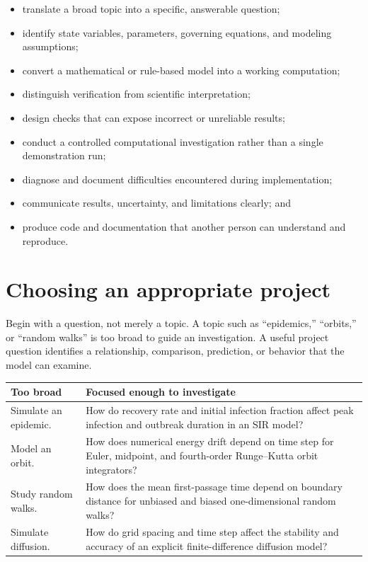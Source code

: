 \documentclass[11pt]{article}
\begin{document}
\begin{itemize}
  \item translate a broad topic into a specific, answerable question;
  \item identify state variables, parameters, governing equations, and modeling
        assumptions;
  \item convert a mathematical or rule-based model into a working computation;
  \item distinguish verification from scientific interpretation;
  \item design checks that can expose incorrect or unreliable results;
  \item conduct a controlled computational investigation rather than a single
        demonstration run;
  \item diagnose and document difficulties encountered during implementation;
  \item communicate results, uncertainty, and limitations clearly; and
  \item produce code and documentation that another person can understand and
        reproduce.
\end{itemize}

\section{Choosing an appropriate project}

Begin with a question, not merely a topic. A topic such as ``epidemics,''
``orbits,'' or ``random walks'' is too broad to guide an investigation. A useful
project question identifies a relationship, comparison, prediction, or behavior
that the model can examine.

\begin{center}
\begin{tabular}{>{\raggedright\arraybackslash}p{}
                >{\raggedright\arraybackslash}p{}}
\toprule
\rowcolor{lightgray}
\textbf{Too broad} & \textbf{Focused enough to investigate} \\
\midrule
Simulate an epidemic. & How do recovery rate and initial infection fraction
affect peak infection and outbreak duration in an SIR model? \\
Model an orbit. & How does numerical energy drift depend on time step for Euler,
midpoint, and fourth-order Runge--Kutta orbit integrators? \\
Study random walks. & How does the mean first-passage time depend on boundary
distance for unbiased and biased one-dimensional random walks? \\
Simulate diffusion. & How do grid spacing and time step affect the stability and
accuracy of an explicit finite-difference diffusion model? \\
\bottomrule
\end{tabular}
\end{center}
\end{document}
